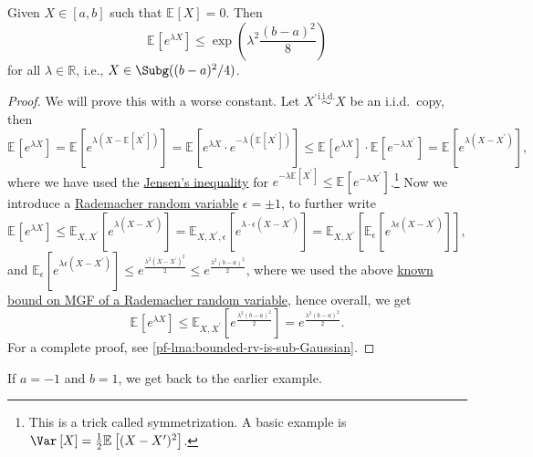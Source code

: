 \begin{lemma}\label{lma:bounded-rv-is-sub-Gaussian}
	Given \(X\in [a, b]\) such that \(\mathbb{E}_{}\left[X \right] = 0\). Then
	\[
		\mathbb{E}_{}\left[e^{\lambda X} \right] \leq \exp (\lambda ^2 \frac{(b-a)^2}{8})
	\]
	for all \(\lambda \in \mathbb{R} \), i.e., \(X\in \Subg((b-a)^2 / 4) \).
\end{lemma}
\begin{proof}
	We will prove this with a worse constant. Let \(X^{\prime} \overset{\text{i.i.d.} }{\sim } X\) be an i.i.d.\ copy, then
	\[
		\mathbb{E}_{}\left[e^{\lambda X} \right]
		= \mathbb{E}_{}\left[e^{\lambda (X - \mathbb{E}_{}\left[X^{\prime}  \right] )} \right]
		= \mathbb{E}_{}\left[e^{\lambda X}\cdot e^{-\lambda (\mathbb{E}_{}\left[X^{\prime}  \right] )} \right]
		\leq \mathbb{E}_{}\left[e^{\lambda X} \right] \cdot \mathbb{E}_{}\left[e^{-\lambda X^{\prime} } \right]
		= \mathbb{E}_{}\left[e^{\lambda (X - X^{\prime} )} \right],
	\]
	where we have used the \href{https://en.wikipedia.org/wiki/Jensen%27s_inequality}{Jensen's inequality} for \(e^{-\lambda \mathbb{E}_{}\left[X^{\prime}  \right] } \leq \mathbb{E}_{}\left[e^{-\lambda X^{\prime} } \right] \).\footnote{This is a trick called symmetrization. A basic example is \(\Var_{}\left[X \right] = \frac{1}{2} \mathbb{E}_{}\left[(X - X^{\prime} )^2 \right] \).} Now we introduce a \hyperref[eg:Rademacher-random-varaible]{Rademacher random variable} \(\epsilon = \pm 1\), to further write
	\[
		\mathbb{E}_{}\left[e^{\lambda X} \right]
		\leq \mathbb{E}_{X, X^{\prime} }\left[e^{\lambda (X - X^{\prime} )} \right]
		= \mathbb{E}_{X, X^{\prime} , \epsilon }\left[ e^{\lambda \cdot \epsilon (X - X^{\prime} )} \right]
		= \mathbb{E}_{X, X^{\prime} }\left[ \mathbb{E}_{\epsilon }\left[e^{\lambda \epsilon (X - X^{\prime} )} \right]  \right] ,
	\]
	and \(\mathbb{E}_{\epsilon }\left[ e^{\lambda \epsilon (X - X^{\prime} )} \right] \leq e^{\frac{\lambda ^2(X - X^{\prime} )^2}{2}} \leq e^{\frac{\lambda ^2(b - a)^2}{2}} \), where we used the above \hyperref[eg:Rademacher-random-varaible]{known bound on MGF of a Rademacher random variable}, hence overall, we get
	\[
		\mathbb{E}_{}\left[e^{\lambda X} \right] \leq \mathbb{E}_{X, X^{\prime} }\left[e^{\frac{\lambda ^2(b-a)^2}{2}} \right] = e^{\frac{\lambda ^2(b-a)^2}{2}}.
	\]
	For a complete proof, see \autoref{pf-lma:bounded-rv-is-sub-Gaussian}.
\end{proof}

\begin{note}
	If \(a = -1\) and \(b = 1\), we get back to the earlier example.
\end{note}

